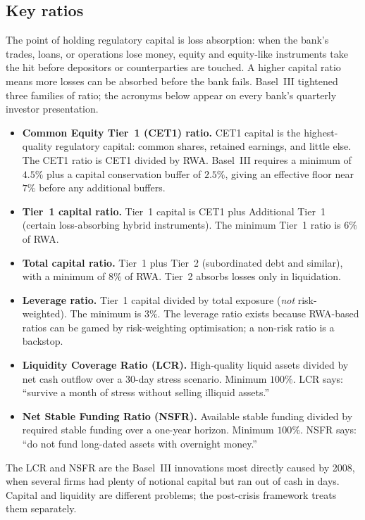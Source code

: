 \subsection{Key ratios}

The point of holding regulatory capital is loss absorption: when
the bank's trades, loans, or operations lose money, equity and
equity-like instruments take the hit before depositors or
counterparties are touched.  A higher capital ratio means more
losses can be absorbed before the bank fails.  Basel~III
tightened three families of ratio; the acronyms below appear on
every bank's quarterly investor presentation.

\begin{itemize}
  \item \textbf{Common Equity Tier~1 (CET1) ratio.}  CET1
    capital is the highest-quality regulatory capital: common
    shares, retained earnings, and little else.  The CET1
    ratio is CET1 divided by RWA.  Basel~III requires a
    minimum of $4.5\%$ plus a capital conservation buffer of
    $2.5\%$, giving an effective floor near $7\%$ before any
    additional buffers.
  \item \textbf{Tier~1 capital ratio.}  Tier~1 capital is CET1
    plus Additional Tier~1 (certain loss-absorbing hybrid
    instruments).  The minimum Tier~1 ratio is $6\%$ of RWA.
  \item \textbf{Total capital ratio.}  Tier~1 plus Tier~2
    (subordinated debt and similar), with a minimum of $8\%$
    of RWA.  Tier~2 absorbs losses only in liquidation.
  \item \textbf{Leverage ratio.}  Tier~1 capital divided by
    total exposure (\emph{not} risk-weighted).  The minimum is
    $3\%$.  The leverage ratio exists because RWA-based ratios
    can be gamed by risk-weighting optimisation; a non-risk
    ratio is a backstop.
  \item \textbf{Liquidity Coverage Ratio (LCR).}  High-quality
    liquid assets divided by net cash outflow over a 30-day
    stress scenario.  Minimum $100\%$.  LCR says: ``survive a
    month of stress without selling illiquid assets.''
  \item \textbf{Net Stable Funding Ratio (NSFR).}  Available
    stable funding divided by required stable funding over a
    one-year horizon.  Minimum $100\%$.  NSFR says: ``do not
    fund long-dated assets with overnight money.''
\end{itemize}

The LCR and NSFR are the Basel~III innovations most directly
caused by 2008, when several firms had plenty of notional capital
but ran out of cash in days.  Capital and liquidity are different
problems; the post-crisis framework treats them separately.

